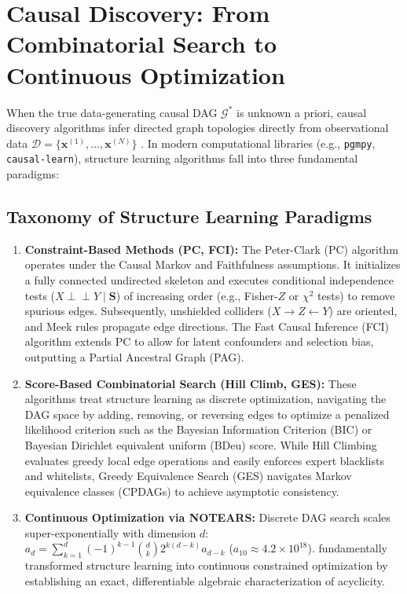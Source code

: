 \section{Causal Discovery: From Combinatorial Search to Continuous Optimization}
\label{sec:bg_causal_discovery}

When the true data-generating causal DAG $\mathcal{G}^*$ is unknown a priori, causal discovery algorithms infer directed graph topologies directly from observational data $\mathcal{D} = \{\mathbf{x}^{(1)}, \dots, \mathbf{x}^{(N)}\}$ \parencite{zheng2018notears}. In modern computational libraries (e.g., \texttt{pgmpy}, \texttt{causal-learn}), structure learning algorithms fall into three fundamental paradigms:

\subsection{Taxonomy of Structure Learning Paradigms}
\begin{enumerate}
    \item \textbf{Constraint-Based Methods (PC, FCI):} The Peter-Clark (PC) algorithm operates under the Causal Markov and Faithfulness assumptions. It initializes a fully connected undirected skeleton and executes conditional independence tests ($X \perp\!\!\!\perp Y \mid \mathbf{S}$) of increasing order (e.g., Fisher-$Z$ or $\chi^2$ tests) to remove spurious edges. Subsequently, unshielded colliders ($X \to Z \leftarrow Y$) are oriented, and Meek rules propagate edge directions. The Fast Causal Inference (FCI) algorithm extends PC to allow for latent confounders and selection bias, outputting a Partial Ancestral Graph (PAG).
    \item \textbf{Score-Based Combinatorial Search (Hill Climb, GES):} These algorithms treat structure learning as discrete optimization, navigating the DAG space by adding, removing, or reversing edges to optimize a penalized likelihood criterion such as the Bayesian Information Criterion (BIC) or Bayesian Dirichlet equivalent uniform (BDeu) score. While Hill Climbing evaluates greedy local edge operations and easily enforces expert blacklists and whitelists, Greedy Equivalence Search (GES) navigates Markov equivalence classes (CPDAGs) to achieve asymptotic consistency.
    \item \textbf{Continuous Optimization via NOTEARS:} Discrete DAG search scales super-exponentially with dimension $d$: $a_d = \sum_{k=1}^d (-1)^{k-1} \binom{d}{k} 2^{k(d-k)} a_{d-k}$ ($a_{10} \approx 4.2 \times 10^{18}$). \textcite{zheng2018notears} fundamentally transformed structure learning into continuous constrained optimization by establishing an exact, differentiable algebraic characterization of acyclicity.
\end{enumerate}

